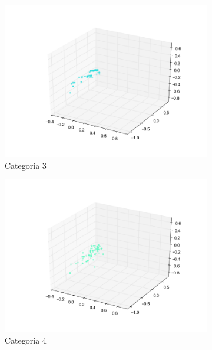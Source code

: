 \begin{figure}[H]
\begin{subfigure}[b]{0.33\textwidth}
                \includegraphics[width=\linewidth]{secciones/graficos/sanger/categoria_3.png}
                \caption{Categoría 3}
                \label{fig: ej1_sanger_categoria_4}
        \end{subfigure}
        \begin{subfigure}[b]{0.33\textwidth}
                \includegraphics[width=\linewidth]{secciones/graficos/sanger/categoria_4.png}
                \caption{Categoría 4}
                \label{fig: ej1_sanger_categoria_4}
        \end{subfigure}
        \begin{subfigure}[b]{0.33\textwidth}

\end{subfigure}
\end{figure}
